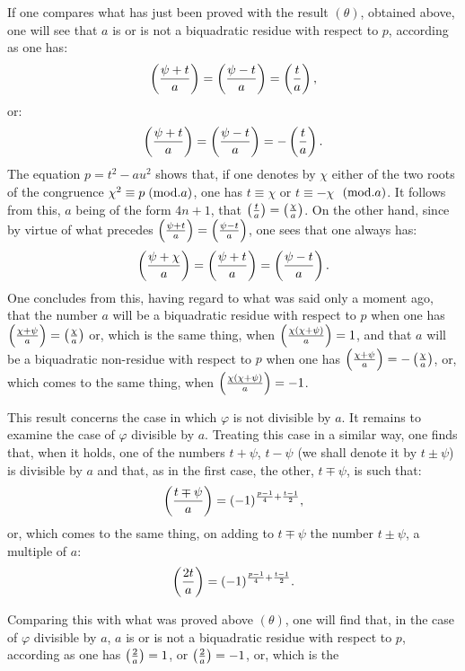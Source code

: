 \noindent
If one compares what has just been proved with the result $(\theta)$, obtained above,
one will see that $a$ is or is not a biquadratic residue with respect to $p$, according
as one has:
\[
\left(\frac{\psi+t}{a}\right)=\left(\frac{\psi-t}{a}\right)=\left(\frac{t}{a}\right),
\]
or:
\[
\left(\frac{\psi+t}{a}\right)=\left(\frac{\psi-t}{a}\right)=-\left(\frac{t}{a}\right).
\]
The equation $p=t^2-au^2$ shows that, if one denotes by $\chi$ either
of the two roots of the congruence $\chi^2\equiv p\;(\mathrm{mod}.a)$, one has $t\equiv\chi$ or $t\equiv-\chi$
$\;(\mathrm{mod}.a)$. It follows from this, $a$ being of the form $4n+1$, that $\left(\frac{t}{a}\right)=\left(\frac{\chi}{a}\right)$.
On the other hand, since by virtue of what precedes $\left(\frac{\psi+t}{a}\right)=\left(\frac{\psi-t}{a}\right)$, one sees that one
always has:
\[
\left(\frac{\psi+\chi}{a}\right)=\left(\frac{\psi+t}{a}\right)=\left(\frac{\psi-t}{a}\right).
\]
One concludes from this, having regard to what was said only a moment ago,
that the number $a$ will be a biquadratic residue with respect to $p$ when one has
$\left(\frac{\chi+\psi}{a}\right)=\left(\frac{\chi}{a}\right)$ or, which is the same thing, when
$\left(\frac{\chi(\chi+\psi)}{a}\right)=1$, and that
$a$ will be a biquadratic non-residue with respect to $p$ when one has $\left(\frac{\chi+\psi}{a}\right)=-\left(\frac{\chi}{a}\right)$,
or, which comes to the same thing, when $\left(\frac{\chi(\chi+\psi)}{a}\right)=-1$.
\par\indent
This result concerns the case in which $\varphi$ is not divisible by $a$. It remains to
examine the case of $\varphi$ divisible by $a$. Treating this case in a similar
way, one finds that, when it holds, one of the numbers $t+\psi$, $t-\psi$ (we shall
denote it by $t\pm\psi$) is divisible by $a$ and that, as in the first case,
the other, $t\mp\psi$, is such that:
\[
\left(\frac{t\mp\psi}{a}\right)=(-1)^{\frac{p-1}{4}+\frac{t-1}{2}},
\]
or, which comes to the same thing, on adding to $t\mp\psi$ the number $t\pm\psi$, a multiple of $a$:
\[
\left(\frac{2t}{a}\right)=(-1)^{\frac{p-1}{4}+\frac{t-1}{2}}.
\]
\par\indent
Comparing this with what was proved above $(\theta)$, one will find
that, in the case of $\varphi$ divisible by $a$, $a$ is or is not a biquadratic residue
with respect to $p$, according as one has $\left(\frac{2}{a}\right)=1$, or $\left(\frac{2}{a}\right)=-1$, or, which is the
